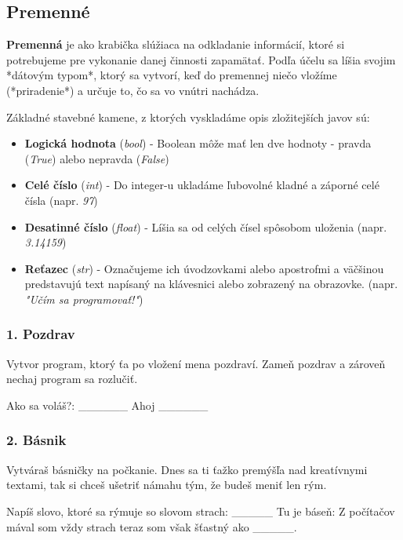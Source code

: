 \subsection{Premenné}
\textbf{Premenná} je ako krabička slúžiaca na odkladanie informácií, ktoré si potrebujeme pre vykonanie danej činnosti zapamätať. Podľa účelu sa líšia svojim *dátovým typom*, ktorý sa vytvorí, keď do premennej niečo vložíme (*priradenie*) a určuje to, čo sa vo vnútri nachádza.

Základné stavebné kamene, z ktorých vyskladáme opis zložitejších javov sú:

\begin{itemize}
\itemsep0pt
\item \textbf{Logická hodnota} (\textit{bool}) - Boolean môže mať len dve hodnoty - pravda (\textit{True}) alebo nepravda (\textit{False})
\item \textbf{Celé číslo} (\textit{int}) - Do integer-u ukladáme ľubovolné kladné a záporné celé čísla (napr. \textit{97})
\item \textbf{Desatinné číslo} (\textit{float}) - Líšia sa od celých čísel spôsobom uloženia (napr. \textit{3.14159})
\item \textbf{Reťazec} (\textit{str}) - Označujeme ich úvodzovkami alebo apostrofmi a väčšinou predstavujú text napísaný na klávesnici alebo zobrazený na obrazovke. (napr. \textit{"Učím sa programovať!"})
\end{itemize}

\subsubsection*{1. Pozdrav}
Vytvor program, ktorý ťa po vložení mena pozdraví. Zameň pozdrav a zároveň nechaj program sa rozlučiť.

\begin{code}
Ako sa voláš?: ______
Ahoj ______
\end{code}

\subsubsection*{2. Básnik}
Vytváraš básničky na počkanie. Dnes sa ti ťažko premýšľa nad kreatívnymi textami, tak si chceš ušetriť námahu tým, že budeš meniť len rým.

\begin{code}
Napíš slovo, ktoré sa rýmuje so slovom strach: _____
Tu je báseň:
Z počítačov mával som vždy strach
teraz som však šťastný ako _____.
\end{code}


